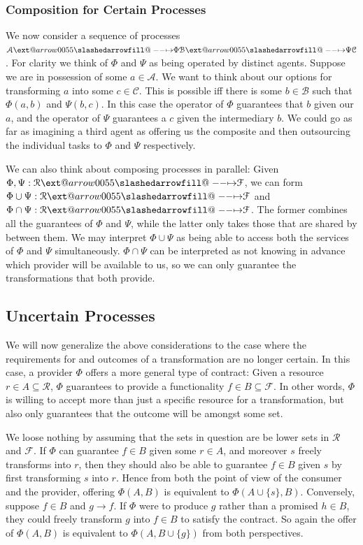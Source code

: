\documentclass[12pt]{article}
\makeatletter
\theoremstyle{definition}
\theoremstyle{plain}
\theoremstyle{plain}
\theoremstyle{plain}
\theoremstyle{plain}
\theoremstyle{remark}
\theoremstyle{remark}
\newcommand{\mc}[1]{\mathcal{#1}}
\newcommand{\sub}{\subseteq}
\def\slashedarrowfill@#1#2#3#4#5{%
	$\m@th\thickmuskip0mu\medmuskip\thickmuskip\thinmuskip\thickmuskip
	\relax#5#1\mkern-7mu%
	\cleaders\hbox{$#5\mkern-2mu#2\mkern-2mu$}\hfill
	\mathclap{#3}\mathclap{#2}%
	\cleaders\hbox{$#5\mkern-2mu#2\mkern-2mu$}\hfill
	\mkern-7mu#4$%
}
\def\rightslashedarrowfill@{%
	\slashedarrowfill@\relbar\relbar\mapstochar\rightarrow}
\newcommand\xslashedrightarrow[2][]{%
	\ext@arrow 0055{\rightslashedarrowfill@}{#1}{#2}}
\makeatother
\begin{document}
\subsubsection{Composition for Certain Processes}
We now consider a sequence of processes $\mc{A} \xslashedrightarrow{\Phi} \mc{B} \xslashedrightarrow{\Psi} \mc{C}$. For clarity we think of $\Phi$ and $\Psi$ as being operated by distinct agents. Suppose we are in possession of some $a \in \mc{A}$. We want to think about our options for transforming $a$ into some $c \in \mc{C}$. This is possible iff there is some $b \in \mc{B}$ such that $\Phi(a,b)$ and $\Psi(b,c)$. In this case the operator of $\Phi$ guarantees that $b$ given our $a$, and the operator of $\Psi$ guarantees a $c$ given the intermediary $b$. We could go as far as imagining a third agent as offering us the composite and then outsourcing the individual tasks to $\Phi$ and $\Psi$ respectively.

We can also think about composing processes in parallel: Given $\Phi,\Psi :\mc{R} \xslashedrightarrow{} \mc{F}$, we can form $\Phi \cup \Psi :\mc{R} \xslashedrightarrow{} \mc{F}$ and $\Phi \cap \Psi :\mc{R} \xslashedrightarrow{} \mc{F}$. The former combines all the guarantees of $\Phi$ and $\Psi$, while the latter only takes those that are shared by between them. We may interpret $\Phi \cup \Psi$ as being able to access both the services of $\Phi$ and $\Psi$ simultaneously. $\Phi \cap \Psi$ can be interpreted as not knowing in advance which provider will be available to us, so we can only guarantee the transformations that both provide.

\subsection{Uncertain Processes}
We will now generalize the above considerations to the case where the requirements for and outcomes of a transformation are no longer certain. In this case, a provider $\Phi$ offers a more general type of contract: Given a resource $r \in A \sub \mc{R}$, $\Phi$ guarantees to provide a functionality $f \in B \sub \mc{F}$. In other words, $\Phi$ is willing to accept more than just a specific resource for a transformation, but also only guarantees that the outcome will be amongst some set. 

We loose nothing by assuming that the sets in question are be lower sets in $\mc{R}$ and $\mc{F}$. If $\Phi$ can guarantee $f \in B$ given some $r \in  A$, and moreover $s$ freely transforms into $r$, then they should also be able to guarantee $f \in B$ given $s$ by first transforming $s$ into $r$. Hence from both the point of view of the consumer and the provider, offering $\Phi(A,B)$ is equivalent to $\Phi(A \cup \{s\}, B)$. Conversely, suppose $f \in B$ and $g \rightarrow f$. If $\Phi$ were to produce $g$ rather than a promised $h \in B$, they could freely transform $g$ into $f \in B$ to satisfy the contract. So again the offer of $\Phi(A,B)$ is equivalent to $\Phi(A,B \cup \{g\})$ from both perspectives.
\end{document}
